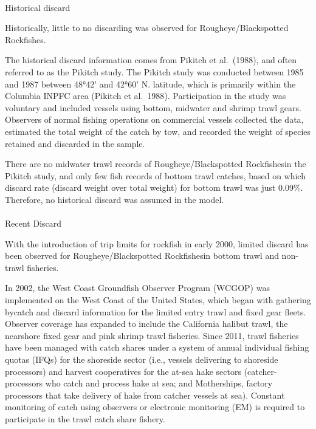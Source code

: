 \documentclass[
]{scrartcl}
\makeatletter
\let\oldparagraph\paragraph
\renewcommand{\paragraph}{
    \@ifstar
      \xxxParagraphStar
      \xxxParagraphNoStar
  }
\newcommand{\xxxParagraphStar}[1]{\oldparagraph*{#1}\mbox{}}
\newcommand{\xxxParagraphNoStar}[1]{\oldparagraph{#1}\mbox{}}
\makeatother
\begin{document}
\paragraph{Historical discard}\label{historical-discard}

Historically, little to no discarding was observed for
Rougheye/Blackspotted Rockfishes.

The historical discard information comes from Pikitch et al.~(1988), and
often referred to as the Pikitch study. The Pikitch study was conducted
between 1985 and 1987 between 48°42' and 42°60' N. latitude, which is
primarily within the Columbia INPFC area (Pikitch et al.~1988).
Participation in the study was voluntary and included vessels using
bottom, midwater and shrimp trawl gears. Observers of normal fishing
operations on commercial vessels collected the data, estimated the total
weight of the catch by tow, and recorded the weight of species retained
and discarded in the sample.

There are no midwater trawl records of Rougheye/Blackspotted
Rockfishesin the Pikitch study, and only few fish records of bottom
trawl catches, based on which discard rate (discard weight over total
weight) for bottom trawl was just 0.09\%. Therefore, no historical
discard was assumed in the model.

\paragraph{Recent Discard}\label{recent-discard}

With the introduction of trip limits for rockfish in early 2000, limited
discard has been observed for Rougheye/Blackspotted Rockfishesin bottom
trawl and non-trawl fisheries.

In 2002, the West Coast Groundfish Observer Program (WCGOP) was
implemented on the West Coast of the United States, which began with
gathering bycatch and discard information for the limited entry trawl
and fixed gear fleets. Observer coverage has expanded to include the
California halibut trawl, the nearshore fixed gear and pink shrimp trawl
fisheries. Since 2011, trawl fisheries have been managed with catch
shares under a system of annual individual fishing quotas (IFQs) for the
shoreside sector (i.e., vessels delivering to shoreside processors) and
harvest cooperatives for the at-sea hake sectors (catcher-processors who
catch and process hake at sea; and Motherships, factory processors that
take delivery of hake from catcher vessels at sea). Constant monitoring
of catch using observers or electronic monitoring (EM) is required to
participate in the trawl catch share fishery.
\end{document}
